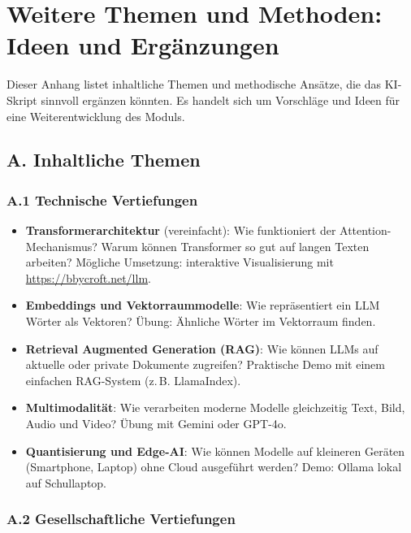 \chapter{Weitere Themen und Methoden: Ideen und Ergänzungen}\label{ch:Appendix_Weitere_Themen}

\begin{myremark}
Dieser Anhang listet inhaltliche Themen und methodische Ansätze, die das
KI-Skript sinnvoll ergänzen könnten. Es handelt sich um Vorschläge und
Ideen für eine Weiterentwicklung des Moduls.
\end{myremark}

\section*{A. Inhaltliche Themen}

\subsection*{A.1 Technische Vertiefungen}

\begin{itemize}
    \item \textbf{Transformerarchitektur} (vereinfacht): Wie funktioniert
          der Attention-Mechanismus? Warum können Transformer so gut auf
          langen Texten arbeiten? Mögliche Umsetzung: interaktive Visualisierung
          mit \url{https://bbycroft.net/llm}.
    \item \textbf{Embeddings und Vektorraummodelle}: Wie repräsentiert ein LLM
          Wörter als Vektoren? Übung: Ähnliche Wörter im Vektorraum finden.
    \item \textbf{Retrieval Augmented Generation (RAG)}: Wie können LLMs auf
          aktuelle oder private Dokumente zugreifen? Praktische Demo mit einem
          einfachen RAG-System (z.\,B. LlamaIndex).
    \item \textbf{Multimodalität}: Wie verarbeiten moderne Modelle gleichzeitig
          Text, Bild, Audio und Video? Übung mit Gemini oder GPT-4o.
    \item \textbf{Quantisierung und Edge-AI}: Wie können Modelle auf kleineren
          Geräten (Smartphone, Laptop) ohne Cloud ausgeführt werden?
          Demo: Ollama lokal auf Schullaptop.

\end{itemize}

\subsection*{A.2 Gesellschaftliche Vertiefungen}


